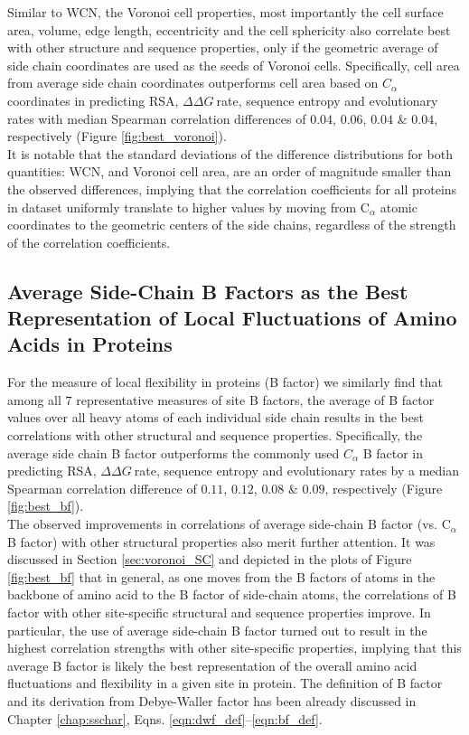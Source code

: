 \documentclass[11pt]{article}
\newcommand{\ddg}{$\Delta\Delta G~$}
\begin{document}
    Similar to WCN, the Voronoi cell properties, most importantly the cell surface area, volume, edge length, eccentricity and the cell sphericity also correlate best with other structure and sequence properties, only if the geometric average of side chain coordinates are used as the seeds of Voronoi cells. Specifically, cell area from average side chain coordinates outperforms cell area based on $C_\alpha$ coordinates in predicting RSA, \ddg rate, sequence entropy and evolutionary rates with median Spearman correlation differences of $0.04$, $0.06$, $0.04$ \& $0.04$, respectively (Figure \ref{fig:best_voronoi}). \\

    It is notable that the standard deviations of the difference distributions for both quantities: WCN, and Voronoi cell area, are an order of magnitude smaller than the observed differences, implying that the correlation coefficients for all proteins in dataset uniformly translate to higher values by moving from C$_\alpha$ atomic coordinates to the geometric centers of the side chains, regardless of the strength of the correlation coefficients. \\

    \subsection{Average Side-Chain B Factors as the Best Representation of Local Fluctuations of Amino Acids in Proteins}

    For the measure of local flexibility in proteins (B factor) we similarly find that among all $7$ representative measures of site B factors, the average of B factor values over all heavy atoms of each individual side chain results in the best correlations with other structural and sequence properties. Specifically, the average side chain B factor outperforms the commonly used $C_\alpha$ B factor in predicting RSA, \ddg rate, sequence entropy and evolutionary rates by a median Spearman correlation difference of $0.11$, $0.12$, $0.08$ \& $0.09$, respectively (Figure \ref{fig:best_bf}). \\


    The observed improvements in correlations of average side-chain B factor (vs. C$_\alpha$ B factor) with other structural properties also merit further attention. It was discussed in Section \ref{sec:voronoi_SC} and depicted in the plots of Figure \ref{fig:best_bf} that in general, as one moves from the B factors of atoms in the backbone of amino acid to the B factor of side-chain atoms, the correlations of B factor with other site-specific structural and sequence properties improve. In particular, the use of average side-chain B factor turned out to result in the highest correlation strengths with other site-specific properties, implying that this average B factor is likely the best representation of the overall amino acid fluctuations and flexibility in a given site in protein.  The definition of B factor and its derivation from Debye-Waller factor has been already discussed in Chapter \ref{chap:sschar}, Eqns. \ref{eqn:dwf_def}--\ref{eqn:bf_def}. \\
\end{document}
